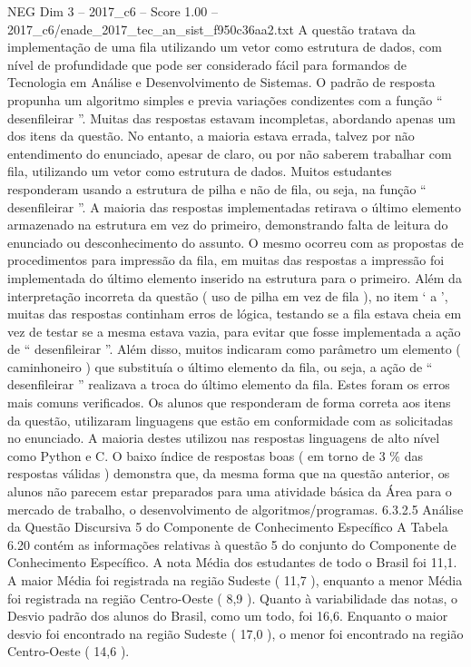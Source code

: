 \begin{textsample}{NEG Dim 3 – 2017\_c6 – Score 1.00 – 2017\_c6/enade\_2017\_tec\_an\_sist\_f950c36aa2.txt}
A questão tratava da implementação de uma fila utilizando um vetor como estrutura de dados, com nível de profundidade que pode ser considerado fácil para formandos de Tecnologia em Análise e Desenvolvimento de Sistemas.
O padrão de resposta propunha um algoritmo simples e previa variações condizentes com a função “ desenfileirar ”.
Muitas das respostas estavam incompletas, abordando apenas um dos itens da questão.
No entanto, a maioria estava errada, talvez por não entendimento do enunciado, apesar de claro, ou por não saberem trabalhar com fila, utilizando um vetor como estrutura de dados.
Muitos estudantes responderam usando a estrutura de pilha e não de fila, ou seja, na função “ desenfileirar ”.
A maioria das respostas implementadas retirava o último elemento armazenado na estrutura em vez do primeiro, demonstrando falta de leitura do enunciado ou desconhecimento do assunto.
O mesmo ocorreu com as propostas de procedimentos para impressão da fila, em muitas das respostas a impressão foi implementada do último elemento inserido na estrutura para o primeiro.
Além da interpretação incorreta da questão ( uso de pilha em vez de fila ), no item ‘ a ’, muitas das respostas continham erros de lógica, testando se a fila estava cheia em vez de testar se a mesma estava vazia, para evitar que fosse implementada a ação de “ desenfileirar ”.
Além disso, muitos indicaram como parâmetro um elemento ( caminhoneiro ) que substituía o último elemento da fila, ou seja, a ação de “ desenfileirar ” realizava a troca do último elemento da fila.
Estes foram os erros mais comuns verificados.
Os alunos que responderam de forma correta aos itens da questão, utilizaram linguagens que estão em conformidade com as solicitadas no enunciado.
A maioria destes utilizou nas respostas linguagens de alto nível como Python e C.
O baixo índice de respostas boas ( em torno de 3 \% das respostas válidas ) demonstra que, da mesma forma que na questão anterior, os alunos não parecem estar preparados para uma atividade básica da Área para o mercado de trabalho, o desenvolvimento de algoritmos/programas. 6.3.2.5 Análise da Questão Discursiva 5 do Componente de Conhecimento Específico A Tabela 6.20 contém as informações relativas à questão 5 do conjunto do Componente de Conhecimento Específico.
A nota Média dos estudantes de todo o Brasil foi 11,1.
A maior Média foi registrada na região Sudeste ( 11,7 ), enquanto a menor Média foi registrada na região Centro-Oeste ( 8,9 ).
Quanto à variabilidade das notas, o Desvio padrão dos alunos do Brasil, como um todo, foi 16,6.
Enquanto o maior desvio foi encontrado na região Sudeste ( 17,0 ), o menor foi encontrado na região Centro-Oeste ( 14,6 ).

\end{textsample}
